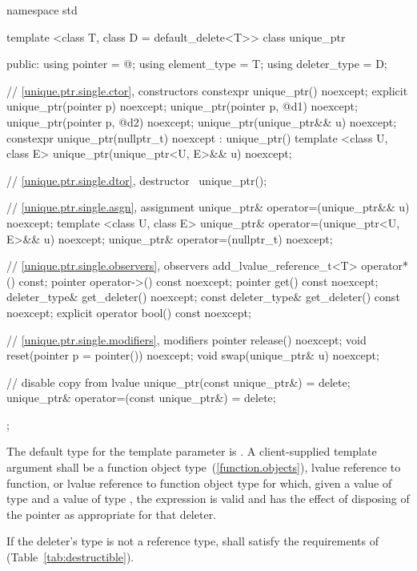 %
\begin{codeblock}
namespace std {
  template <class T, class D = default_delete<T>> class unique_ptr {
  public:
    using pointer      = @\seebelow@;
    using element_type = T;
    using deleter_type = D;

    // \ref{unique.ptr.single.ctor}, constructors
    constexpr unique_ptr() noexcept;
    explicit unique_ptr(pointer p) noexcept;
    unique_ptr(pointer p, @\seebelow@ d1) noexcept;
    unique_ptr(pointer p, @\seebelow@ d2) noexcept;
    unique_ptr(unique_ptr&& u) noexcept;
    constexpr unique_ptr(nullptr_t) noexcept
      : unique_ptr() { }
    template <class U, class E>
      unique_ptr(unique_ptr<U, E>&& u) noexcept;

    // \ref{unique.ptr.single.dtor}, destructor
    ~unique_ptr();

    // \ref{unique.ptr.single.asgn}, assignment
    unique_ptr& operator=(unique_ptr&& u) noexcept;
    template <class U, class E> unique_ptr& operator=(unique_ptr<U, E>&& u) noexcept;
    unique_ptr& operator=(nullptr_t) noexcept;

    // \ref{unique.ptr.single.observers}, observers
    add_lvalue_reference_t<T> operator*() const;
    pointer operator->() const noexcept;
    pointer get() const noexcept;
    deleter_type& get_deleter() noexcept;
    const deleter_type& get_deleter() const noexcept;
    explicit operator bool() const noexcept;

    // \ref{unique.ptr.single.modifiers}, modifiers
    pointer release() noexcept;
    void reset(pointer p = pointer()) noexcept;
    void swap(unique_ptr& u) noexcept;

    // disable copy from lvalue
    unique_ptr(const unique_ptr&) = delete;
    unique_ptr& operator=(const unique_ptr&) = delete;
  };
}
\end{codeblock}

\pnum
The default type for the template parameter  is
. A client-supplied template argument
 shall be a function
object type~(\ref{function.objects}), lvalue reference to function, or
lvalue reference to function object type
for which, given
a value  of type  and a value
 of type , the expression
 is valid and has the effect of disposing of the
pointer as appropriate for that deleter.

\pnum
If the deleter's type  is not a reference type,  shall satisfy
the requirements of  (Table~\ref{tab:destructible}).


